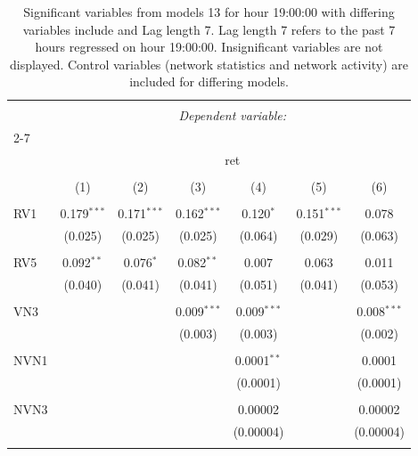 
\begin{table}[!htbp] \centering 
  \caption{Significant variables from models 13 for hour 19:00:00 with differing variables include 
                               and Lag length 7. Lag length 7 refers to the past 7 hours regressed on hour 19:00:00. 
                               Insignificant variables are not displayed. 
                               Control variables (network statistics and network activity) are 
                               included for differing models.} 
  \label{RVmodels1_t_hourlagged6} 
\scriptsize 
\begin{tabular}{@{\extracolsep{5pt}}lcccccc} 
\\[-1.8ex]\hline 
\hline \\[-1.8ex] 
 & \multicolumn{6}{c}{\textit{Dependent variable:}} \\ 
\cline{2-7} 
\\[-1.8ex] & \multicolumn{6}{c}{ret} \\ 
\\[-1.8ex] & (1) & (2) & (3) & (4) & (5) & (6)\\ 
\hline \\[-1.8ex] 
 RV1 & 0.179$^{***}$ & 0.171$^{***}$ & 0.162$^{***}$ & 0.120$^{*}$ & 0.151$^{***}$ & 0.078 \\ 
  & (0.025) & (0.025) & (0.025) & (0.064) & (0.029) & (0.063) \\ 
  & & & & & & \\ 
 RV5 & 0.092$^{**}$ & 0.076$^{*}$ & 0.082$^{**}$ & 0.007 & 0.063 & 0.011 \\ 
  & (0.040) & (0.041) & (0.041) & (0.051) & (0.041) & (0.053) \\ 
  & & & & & & \\ 
 VN3 &  &  & 0.009$^{***}$ & 0.009$^{***}$ &  & 0.008$^{***}$ \\ 
  &  &  & (0.003) & (0.003) &  & (0.002) \\ 
  & & & & & & \\ 
 NVN1 &  &  &  & 0.0001$^{**}$ &  & 0.0001 \\ 
  &  &  &  & (0.0001) &  & (0.0001) \\ 
  & & & & & & \\ 
 NVN3 &  &  &  & 0.00002 &  & 0.00002 \\ 
  &  &  &  & (0.00004) &  & (0.00004) \\ 
  & & & & & & \\ 

\end{tabular}
\end{table}
